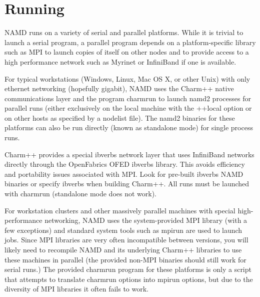
\section{Running \NAMD}
\label{section:run}

NAMD runs on a variety of serial and parallel platforms.  While it is
trivial to launch a serial program, a parallel program depends on a
platform-specific library such as MPI to launch copies of itself on
other nodes and to provide access to a high performance network such
as Myrinet or InfiniBand if one is available.

For typical workstations (Windows, Linux, Mac OS X, or other Unix)
with only ethernet networking (hopefully gigabit), NAMD uses the
Charm++ native communications layer and the program charmrun to launch
namd2 processes for parallel runs (either exclusively on the local
machine with the ++local option or on other hosts as specified by a
nodelist file).  The namd2 binaries for these platforms can also be
run directly (known as standalone mode) for single process runs.

Charm++ provides a special ibverbs network layer that uses InfiniBand
networks directly through the OpenFabrics OFED ibverbs library.  This
avoids efficiency and portability issues associated with MPI.  Look for
pre-built ibverbs NAMD binaries or specify ibverbs when building Charm++.
All runs must be launched with charmrun (standalone mode does not work).

For workstation clusters and other massively parallel machines with
special high-performance networking, NAMD uses the system-provided
MPI library (with a few exceptions) and standard system tools such as
mpirun are used to launch jobs.  Since MPI libraries are very often
incompatible between versions, you will likely need to recompile NAMD
and its underlying Charm++ libraries to use these machines in parallel
(the provided non-MPI binaries should still work for serial runs.)
The provided charmrun program for these platforms is only a script
that attempts to translate charmrun options into mpirun options, but
due to the diversity of MPI libraries it often fails to work.

